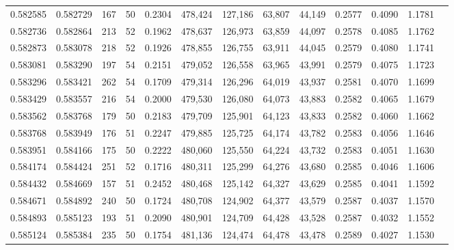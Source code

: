 \begin{tabular}{rrrrrrrrrrrrr}
0.582585 & 0.582729 &   167 &  50 &                                     0.2304 & 478,424 & 127,186 &  63,807 &  44,149 & 0.2577 & 0.4090 & 1.1781 \\
0.582736 & 0.582864 &   213 &  52 &                                     0.1962 & 478,637 & 126,973 &  63,859 &  44,097 & 0.2578 & 0.4085 & 1.1762 \\
0.582873 & 0.583078 &   218 &  52 &                                     0.1926 & 478,855 & 126,755 &  63,911 &  44,045 & 0.2579 & 0.4080 & 1.1741 \\
0.583081 & 0.583290 &   197 &  54 &                                     0.2151 & 479,052 & 126,558 &  63,965 &  43,991 & 0.2579 & 0.4075 & 1.1723 \\
0.583296 & 0.583421 &   262 &  54 &                                     0.1709 & 479,314 & 126,296 &  64,019 &  43,937 & 0.2581 & 0.4070 & 1.1699 \\
0.583429 & 0.583557 &   216 &  54 &                                     0.2000 & 479,530 & 126,080 &  64,073 &  43,883 & 0.2582 & 0.4065 & 1.1679 \\
0.583562 & 0.583768 &   179 &  50 &                                     0.2183 & 479,709 & 125,901 &  64,123 &  43,833 & 0.2582 & 0.4060 & 1.1662 \\
0.583768 & 0.583949 &   176 &  51 &                                     0.2247 & 479,885 & 125,725 &  64,174 &  43,782 & 0.2583 & 0.4056 & 1.1646 \\
0.583951 & 0.584166 &   175 &  50 &                                     0.2222 & 480,060 & 125,550 &  64,224 &  43,732 & 0.2583 & 0.4051 & 1.1630 \\
0.584174 & 0.584424 &   251 &  52 &                                     0.1716 & 480,311 & 125,299 &  64,276 &  43,680 & 0.2585 & 0.4046 & 1.1606 \\
0.584432 & 0.584669 &   157 &  51 &                                     0.2452 & 480,468 & 125,142 &  64,327 &  43,629 & 0.2585 & 0.4041 & 1.1592 \\
0.584671 & 0.584892 &   240 &  50 &                                     0.1724 & 480,708 & 124,902 &  64,377 &  43,579 & 0.2587 & 0.4037 & 1.1570 \\
0.584893 & 0.585123 &   193 &  51 &                                     0.2090 & 480,901 & 124,709 &  64,428 &  43,528 & 0.2587 & 0.4032 & 1.1552 \\
0.585124 & 0.585384 &   235 &  50 &                                     0.1754 & 481,136 & 124,474 &  64,478 &  43,478 & 0.2589 & 0.4027 & 1.1530 \\

\end{tabular}
